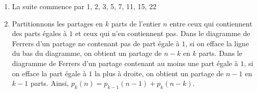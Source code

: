 \begin{exo}
\begin{sol} %
\begin{enumerate}
\item La suite commence par 1, 2, 3, 5, 7, 11, 15, 22
\item Partitionnons les partages en $k$ parts de l'entier $n$ entre ceux qui contiennent des parts égales à $1$ et ceux qui n'en contiennent pas. Dans le diagramme de Ferrers d'un partage ne contenant pas de part égale à $1$, si on efface la ligne du bas du diagramme, on obtient un partage de $n-k$ en $k$ parts. Dans le diagramme de Ferrers d'un partage contenant au moins une part égale à $1$, si on efface la part égale à $1$ la plus à droite, on obtient un partage de $n-1$ en $k-1$ parts. Ainsi, $p_k(n)=p_{k-1}(n-1)+p_k(n-k)$.
\end{enumerate}
\end{sol}
\end{exo}

